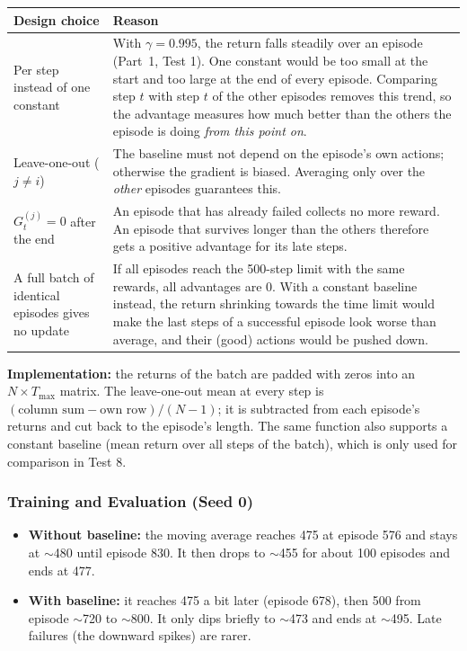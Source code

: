 \begin{center}
\small
\begin{tabularx}{\textwidth}{@{}p{3.6cm}L@{}}
  \toprule
  \textbf{Design choice} & \textbf{Reason} \\
  \midrule
  Per step instead of one constant & With $\gamma = 0.995$, the return falls steadily over an episode (Part~1, Test 1). One constant would be too small at the start and too large at the end of every episode. Comparing step $t$ with step $t$ of the other episodes removes this trend, so the advantage measures how much better than the others the episode is doing \emph{from this point on}. \\
  Leave-one-out ($j \neq i$) & The baseline must not depend on the episode's own actions; otherwise the gradient is biased. Averaging only over the \emph{other} episodes guarantees this. \\
  $G_t^{(j)} = 0$ after the end & An episode that has already failed collects no more reward. An episode that survives longer than the others therefore gets a positive advantage for its late steps. \\
  A full batch of identical episodes gives no update & If all episodes reach the 500-step limit with the same rewards, all advantages are 0. With a constant baseline instead, the return shrinking towards the time limit would make the last steps of a successful episode look worse than average, and their (good) actions would be pushed down. \\
  \bottomrule
\end{tabularx}
\end{center}

\textbf{Implementation:} the returns of the batch are padded with zeros into an $N \times T_{\max}$ matrix. The leave-one-out mean at every step is $(\text{column sum} - \text{own row}) / (N-1)$; it is subtracted from each episode's returns and cut back to the episode's length. The same function also supports a constant baseline (mean return over all steps of the batch), which is only used for comparison in Test 8.

\subsubsection{Training and Evaluation (Seed 0)}


\begin{itemize}
  \item \textbf{Without baseline:} the moving average reaches 475 at episode 576 and stays at $\sim$480 until episode 830. It then drops to $\sim$455 for about 100 episodes and ends at 477.
  \item \textbf{With baseline:} it reaches 475 a bit later (episode 678), then 500 from episode $\sim$720 to $\sim$800. It only dips briefly to $\sim$473 and ends at $\sim$495. Late failures (the downward spikes) are rarer.
\end{itemize}

